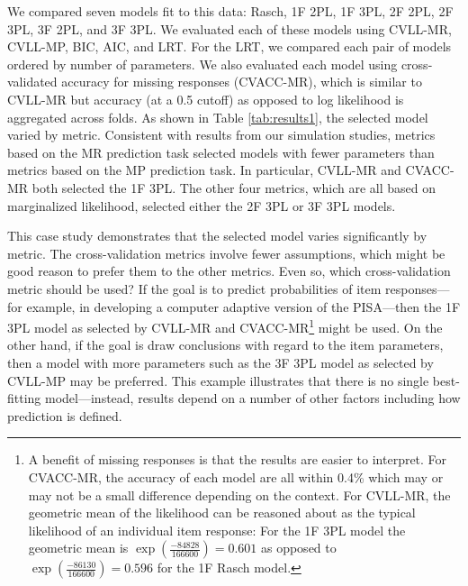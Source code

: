 \documentclass[
  english,
  man,floatsintext]{apa7}
\begin{document}
We compared seven models fit to this data: Rasch, 1F 2PL, 1F 3PL, 2F 2PL, 2F 3PL, 3F 2PL, and 3F 3PL. We evaluated each of these models using CVLL-MR, CVLL-MP, BIC, AIC, and LRT. For the LRT, we compared each pair of models ordered by number of parameters. We also evaluated each model using cross-validated accuracy for missing responses (CVACC-MR), which is similar to CVLL-MR but accuracy (at a 0.5 cutoff) as opposed to log likelihood is aggregated across folds. As shown in Table \ref{tab:results1}, the selected model varied by metric. Consistent with results from our simulation studies, metrics based on the MR prediction task selected models with fewer parameters than metrics based on the MP prediction task. In particular, CVLL-MR and CVACC-MR both selected the 1F 3PL. The other four metrics, which are all based on marginalized likelihood, selected either the 2F 3PL or 3F 3PL models.

This case study demonstrates that the selected model varies significantly by metric. The cross-validation metrics involve fewer assumptions, which might be good reason to prefer them to the other metrics. Even so, which cross-validation metric should be used? If the goal is to predict probabilities of item responses---for example, in developing a computer adaptive version of the PISA---then the 1F 3PL model as selected by CVLL-MR and CVACC-MR\footnote{A benefit of missing responses is that the results are easier to interpret. For CVACC-MR, the accuracy of each model are all within 0.4\% which may or may not be a small difference depending on the context. For CVLL-MR, the geometric mean of the likelihood can be reasoned about as the typical likelihood of an individual item response: For the 1F 3PL model the geometric mean is \(\exp\left(\frac{-84828}{166600}\right) = 0.601\) as opposed to \(\exp\left(\frac{-86130}{166600}\right) = 0.596\) for the 1F Rasch model.} might be used. On the other hand, if the goal is draw conclusions with regard to the item parameters, then a model with more parameters such as the 3F 3PL model as selected by CVLL-MP may be preferred. This example illustrates that there is no single best-fitting model---instead, results depend on a number of other factors including how prediction is defined.
\end{document}
